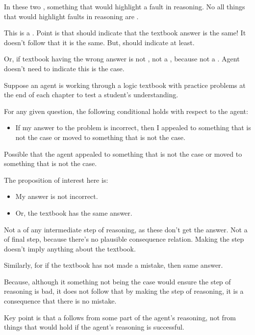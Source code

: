 \begin{note}
  In these two , something that would highlight a fault in reasoning.
  No all things that would highlight faults in reasoning are .
\end{note}


\begin{note}
  {
    \color{red}
    This is a \requ{}.
    Point is that should indicate that the textbook answer is the same!
    It doesn't follow that it is the same.
    But, should indicate at least.

    Or, if textbook having the wrong answer is not \epAdv{}, not a \requ{}, because not a \result{}.
    Agent doesn't need to indicate this is the case.
  }
  \begin{illustration}
    \label{illu:textbook-answers}
    Suppose an agent is working through a logic textbook with practice problems at the end of each chapter to test a student's understanding.

    For any given question, the following conditional holds with respect to the agent:
    \begin{itemize}
    \item If my answer to the problem is incorrect, then I {\color{red} appealed to something that is not the case or moved to something that is not the case}.
    \end{itemize}
  \end{illustration}
  Possible that the agent {\color{red} appealed to something that is not the case or moved to something that is not the case}.

  The proposition of interest here is:
  \begin{itemize}
  \item My answer is not incorrect.
  \item Or, the textbook has the same answer.
  \end{itemize}

  Not a \requ{} of any intermediate step of reasoning, as these don't get the answer.
  Not a \requ{} of final step, because there's no plausible consequence relation.
  Making the step doesn't imply anything about the textbook.

  Similarly, for if the textbook has not made a mistake, then same answer.

  Because, although it something not being the case would ensure the step of reasoning is bad, it does not follow that by making the step of reasoning, it is a consequence that there is no mistake.

  Key point is that a \requ{} follows from some part of the agent's reasoning, not from things that would hold if the agent's reasoning is successful.
\end{note}

